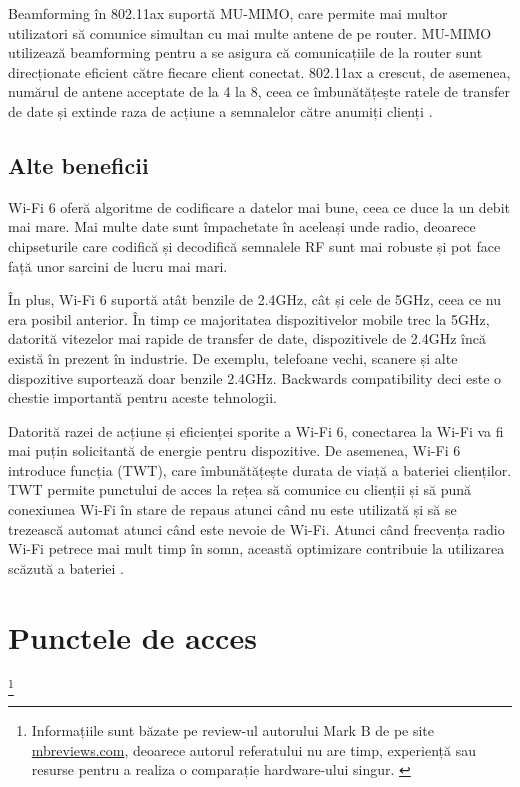 \documentclass[a4paper,12pt]{report}
\def\oldchapter{} \let\oldchapter=\chapter{}
\def\chapter{\stepcounter{num_chapters}\oldchapter}
\begin{document}
Beamforming în 802.11ax suportă \ac{MU-MIMO}, care permite mai multor utilizatori să comunice simultan cu mai multe antene de pe router.
\ac{MU-MIMO} utilizează beamforming pentru a se asigura că comunicațiile de la router sunt direcționate eficient către fiecare client conectat.
802.11ax a crescut, de asemenea, numărul de antene acceptate de la 4 la 8, ceea ce îmbunătățește ratele de transfer de date și extinde raza de acțiune a semnalelor către anumiți clienți \cite{beamforming}.


\section{Alte beneficii}

\ac{Wi-Fi} 6 oferă algoritme de codificare a datelor mai bune, ceea ce duce la un debit mai mare.
Mai multe date sunt împachetate în aceleași unde radio, deoarece chipseturile care codifică și decodifică semnalele \ac{RF} sunt mai robuste și pot face față unor sarcini de lucru mai mari.

În plus, \ac{Wi-Fi} 6 suportă atât benzile de 2.4GHz, cât și cele de 5GHz, ceea ce nu era posibil anterior.
În timp ce majoritatea dispozitivelor mobile trec la 5GHz, datorită vitezelor mai rapide de transfer de date, dispozitivele de 2.4GHz încă există în prezent în industrie.
De exemplu, telefoane vechi, scanere și alte dispozitive suportează doar benzile 2.4GHz.
Backwards compatibility deci este o chestie importantă pentru aceste tehnologii.

Datorită razei de acțiune și eficienței sporite a \ac{Wi-Fi} 6, conectarea la \ac{Wi-Fi} va fi mai puțin solicitantă de energie pentru dispozitive.
De asemenea, \ac{Wi-Fi} 6 introduce funcția (\ac{TWT}), care îmbunătățește durata de viață a bateriei clienților.
\ac{TWT} permite punctului de acces la rețea să comunice cu clienții și să pună conexiunea \ac{Wi-Fi} în stare de repaus atunci când nu este utilizată și să se trezească automat atunci când este nevoie de \ac{Wi-Fi}.
Atunci când frecvența radio \ac{Wi-Fi} petrece mai mult timp în somn, această optimizare contribuie la utilizarea scăzută a bateriei \cite{info_802_11ax__venues}.


\chapter{Punctele de acces} \footnote{Informațiile sunt băzate pe review-ul autorului Mark B de pe site \url{mbreviews.com}, deoarece autorul referatului nu are timp, experiență sau resurse pentru a realiza o comparație hardware-ului singur. \cite{AP_comparison}}
\end{document}
